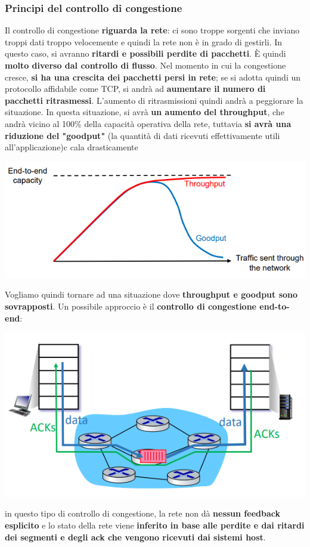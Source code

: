 \documentclass[12pt]{article}
\begin{document}
\subsubsection{Principi del controllo di congestione}
Il controllo di congestione \textbf{riguarda la rete}: ci sono troppe sorgenti che inviano troppi dati troppo velocemente e quindi la rete non è in grado di gestirli.
In questo caso, si avranno \textbf{ritardi e possibili perdite di pacchetti}. È quindi \textbf{molto diverso dal controllo di flusso}.
Nel momento in cui la congestione cresce, \textbf{si ha una crescita dei pacchetti persi in rete}; se si adotta quindi un protocollo affidabile come TCP, si andrà ad \textbf{aumentare il numero di pacchetti ritrasmessi}.
L'aumento di ritrasmissioni quindi andrà a peggiorare la situazione. In questa situazione, si avrà \textbf{un aumento del throughput}, che andrà vicino al 100\% della capacità operativa della rete, tuttavia \textbf{si avrà una riduzione del "goodput"} (la quantità di dati ricevuti effettivamente utili all'applicazione)c
cala drasticamente
\begin{center}
    \includegraphics[width = 0.65\linewidth]{Images/66.png}
\end{center}
Vogliamo quindi tornare ad una situazione dove \textbf{throughput e goodput sono sovrapposti}. Un possibile approccio è il \textbf{controllo di congestione end-to-end}:
\begin{center}
    \includegraphics[width = 0.65\linewidth]{Images/67.png}
\end{center}
in questo tipo di controllo di congestione, la rete non dà \textbf{nessun feedback esplicito} e lo stato della rete viene \textbf{inferito in base alle perdite e dai ritardi dei segmenti e degli ack che vengono ricevuti dai sistemi host}.
\end{document}
